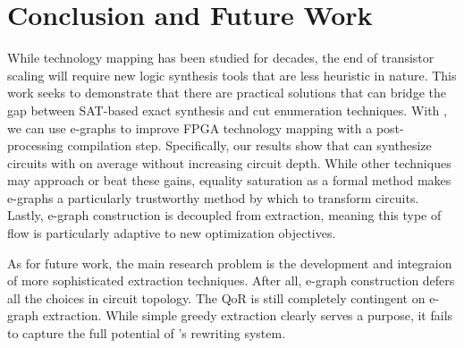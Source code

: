 \section{Conclusion and Future Work}\label{sec:conclusion}
While technology mapping has been studied for decades, the end of transistor
scaling will require new logic synthesis tools that are less heuristic in
nature. This work seeks to demonstrate that there are practical solutions that
can bridge the gap between SAT-based exact synthesis and cut enumeration
techniques. With \shortname{}, we can use e-graphs to improve FPGA technology
mapping with a post-processing compilation step. Specifically, our results show
that \shortname{} can synthesize circuits with \metric{} on average without
increasing circuit depth. While other techniques may approach or beat these
gains, equality saturation as a formal method makes e-graphs a particularly
trustworthy method by which to transform circuits. Lastly, e-graph construction
is decoupled from extraction, meaning this type of flow is particularly
adaptive to new optimization objectives.

As for future work, the main research problem is the development and integraion
of more sophisticated extraction techniques. After all, e-graph construction
defers all the choices in circuit topology. The QoR is still completely
contingent on e-graph extraction. While simple greedy extraction clearly serves
a purpose, it fails to capture the full potential of \shortname{}'s rewriting
system.